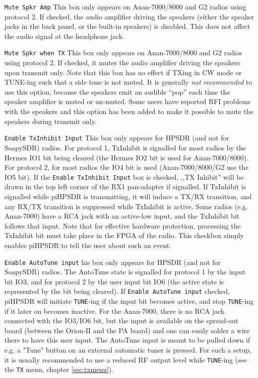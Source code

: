 \documentclass[12pt]{book}
\def\rett#1{\texttt{\color{red}#1}}
\def\bltt#1{\texttt{\color{blue}#1}}
\def\pH{pi\-HPSDR\xspace}
\begin{document}
\rett{Mute Spkr Amp} This box only appears on Anan-7000/8000 and G2 radios using protocol 2.
If checked, the audio amplifier driving the speakers (either the speaker jacks in the
back panel, or the built-in speakers) is disabled. This does not affect the audio signal
at the headphone jack.

\rett{Mute Spkr when TX} This box only appears on Anan-7000/8000 and G2 radios using protocol 2.
If checked, it mutes the audio amplifier driving the speakers upon transmit only.
Note that this box has no effect if TXing in CW mode or TUNE-ing such that a side tone
is not muted. It is generally \textit{not recommended} to use this option, because the
speakers emit an audible ``pop'' each time the speaker amplifier is muted or un-muted.
Some users have reported RFI problems with the speakers and this option has been added
to make it possible to mute the speakers during transmit only.

\rett{Enable TxInhibit Input} This box only appears for HPSDR (and not for SoapySDR)
radios.
For  protocol 1, TxInhibit is signalled for most radios by the Hermes IO1 bit being
cleared (the Hermes IO2 bit is used for Anan-7000/8000). For protocol 2, for most
radios the IO4 bit is used (Anan-7000/8000/G2 use the IO5 bit).
If the \rett{Enable TxInhibit Input} box is checked, ,,TX Inhibit'' will be drawn
in the top left corner of the RX1 pan-adapter if signalled. If TxInhibit is signalled
while \pH is transmitting, it will induce a TX/RX transition, and any RX/TX
transition is suppressed while TxInhibit is active. Some radios (e.g. Anan-7000) have
a RCA jack with an active-low input, and the TxInhibit bit follows that input.
Note that for effective hardware protection, processing the TxInhibit bit must
take place in the FPGA of the radio. This checkbox simply enables \pH to tell
the user about such an event.

\rett{Enable AutoTune  input} his box only appears for HPSDR (and not for SoapySDR)
radios. The AutoTune state is signalled for protocol 1 by the input bit IO3,
and for protocol 2 by the user input bit IO6 (the active state is represented
by the bit being cleared).
If \rett{Enable AutoTune  input} checked, \pH will initiate \bltt{TUNE}-ing if the
input bit becomes active, and stop \bltt{TUNE}-ing if it later on becomes inactive.
For the Anan-7000, there is no RCA jack connected with the IO3/IO6 bit, but the
input is available on the spread-out board (between the Orion-II and the PA board) and one
can easily solder a wire there to have this user input. The AutoTune input is meant to
be pulled down if e.g. a "Tune" button on an external automatic tuner is pressed.
For such a setup, it is usually recommended to use a reduced RF output level while
\bltt{TUNE}-ing  (see the \bltt{TX} menu, chapter \ref{sec:txmenu}).
\end{document}
